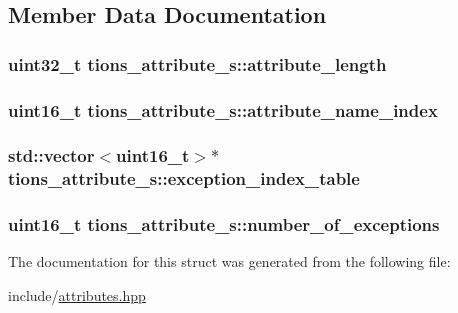 \subsection{Member Data Documentation}
\hypertarget{structtions__attribute__s_ab0b8c06d504e802ce01a0943bbd9bf10}{
\subsubsection[{attribute\+\_\+length}]{\setlength{\rightskip}{0pt plus 5cm}uint32\+\_\+t tions\+\_\+attribute\+\_\+s\+::attribute\+\_\+length}}\label{structtions__attribute__s_ab0b8c06d504e802ce01a0943bbd9bf10}
\hypertarget{structtions__attribute__s_a9b8db8dc3f0a915e0ea293b4a02aced5}{
\subsubsection[{attribute\+\_\+name\+\_\+index}]{\setlength{\rightskip}{0pt plus 5cm}uint16\+\_\+t tions\+\_\+attribute\+\_\+s\+::attribute\+\_\+name\+\_\+index}}\label{structtions__attribute__s_a9b8db8dc3f0a915e0ea293b4a02aced5}
\hypertarget{structtions__attribute__s_affcf7f1a4bad06d919af96858d87a9e6}{
\subsubsection[{exception\+\_\+index\+\_\+table}]{\setlength{\rightskip}{0pt plus 5cm}std\+::vector$<$uint16\+\_\+t$>$$\ast$ tions\+\_\+attribute\+\_\+s\+::exception\+\_\+index\+\_\+table}}\label{structtions__attribute__s_affcf7f1a4bad06d919af96858d87a9e6}
\hypertarget{structtions__attribute__s_a742ecd8b40b51ba831806ec14299c053}{
\subsubsection[{number\+\_\+of\+\_\+exceptions}]{\setlength{\rightskip}{0pt plus 5cm}uint16\+\_\+t tions\+\_\+attribute\+\_\+s\+::number\+\_\+of\+\_\+exceptions}}\label{structtions__attribute__s_a742ecd8b40b51ba831806ec14299c053}


The documentation for this struct was generated from the following file\+:\begin{DoxyCompactItemize}
\item 
include/\hyperlink{attributes_8hpp}{attributes.\+hpp}\end{DoxyCompactItemize}
